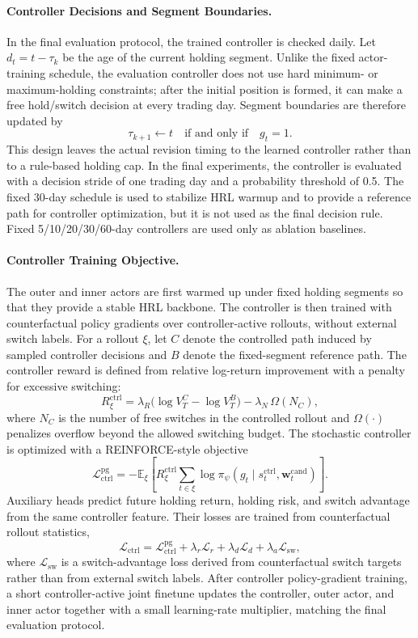 \documentclass[letterpaper]{article} %
\begin{document}
\paragraph{Controller Decisions and Segment Boundaries.}
In the final evaluation protocol, the trained controller is checked daily. Let \(d_t=t-\tau_k\) be the age of the current holding segment. Unlike the fixed actor-training schedule, the evaluation controller does not use hard minimum- or maximum-holding constraints; after the initial position is formed, it can make a free hold/switch decision at every trading day. Segment boundaries are therefore updated by
\[
\tau_{k+1}\leftarrow t
\quad\text{if and only if}\quad
g_t=1.
\]
This design leaves the actual revision timing to the learned controller rather than to a rule-based holding cap. In the final experiments, the controller is evaluated with a decision stride of one trading day and a probability threshold of 0.5. The fixed 30-day schedule is used to stabilize HRL warmup and to provide a reference path for controller optimization, but it is not used as the final decision rule. Fixed 5/10/20/30/60-day controllers are used only as ablation baselines.

\paragraph{Controller Training Objective.}
The outer and inner actors are first warmed up under fixed holding segments so that they provide a stable HRL backbone. The controller is then trained with counterfactual policy gradients over controller-active rollouts, without external switch labels. For a rollout \(\xi\), let \(C\) denote the controlled path induced by sampled controller decisions and \(B\) denote the fixed-segment reference path. The controller reward is defined from relative log-return improvement with a penalty for excessive switching:
\[
R_{\xi}^{\mathrm{ctrl}}
=
\lambda_R\bigl(\log V_T^{C}-\log V_T^{B}\bigr)
-
\lambda_N\,\Omega(N_C),
\]
where \(N_C\) is the number of free switches in the controlled rollout and \(\Omega(\cdot)\) penalizes overflow beyond the allowed switching budget. The stochastic controller is optimized with a REINFORCE-style objective
\[
\mathcal{L}_{\mathrm{ctrl}}^{\mathrm{pg}}
=
-\mathbb{E}_{\xi}\!\left[
R_{\xi}^{\mathrm{ctrl}}
\sum_{t\in\xi}\log\pi_{\psi}(g_t\mid s_t^{\mathrm{ctrl}},\mathbf{w}_t^{\mathrm{cand}})
\right].
\]
Auxiliary heads predict future holding return, holding risk, and switch advantage from the same controller feature. Their losses are trained from counterfactual rollout statistics,
\[
\mathcal{L}_{\mathrm{ctrl}}
=
\mathcal{L}_{\mathrm{ctrl}}^{\mathrm{pg}}
+\lambda_r\mathcal{L}_{r}
+\lambda_d\mathcal{L}_{d}
+\lambda_a\mathcal{L}_{\mathrm{sw}},
\]
where \(\mathcal{L}_{\mathrm{sw}}\) is a switch-advantage loss derived from counterfactual switch targets rather than from external switch labels. After controller policy-gradient training, a short controller-active joint finetune updates the controller, outer actor, and inner actor together with a small learning-rate multiplier, matching the final evaluation protocol.
\end{document}
